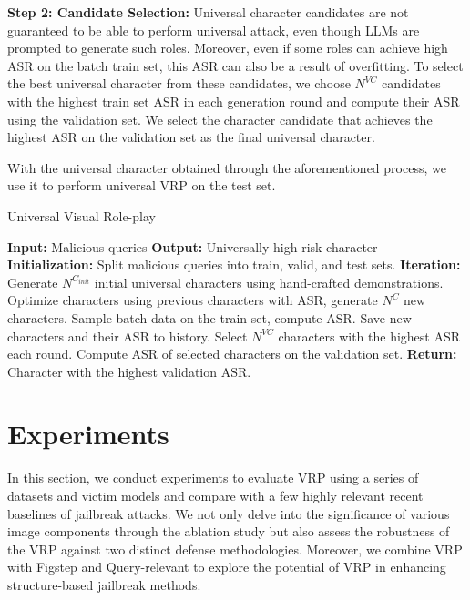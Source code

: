 \textbf{Step 2: Candidate Selection:}
Universal character candidates are not guaranteed to be able to perform universal attack, even though LLMs are prompted to generate such roles. Moreover, even if some roles can achieve high ASR on the batch train set, this ASR can also be a result of overfitting. To select the best universal character from these candidates, we choose $N^{VC}$ candidates with the highest train set ASR in each generation round and compute their ASR using the validation set. We select the character candidate that achieves the highest ASR on the validation set as the final universal character.

With the universal character obtained through the aforementioned process, we use it to perform universal VRP on the test set.

\begin{algorithm}
\caption{Universal Visual Role-play}
\begin{algorithmic}[1]
\State \textbf{Input:} Malicious queries
\State \textbf{Output:} Universally high-risk character
\State \textbf{Initialization:} Split malicious queries into train, valid, and test sets.
\State \textbf{Iteration:}
        \State Generate $N^{C_{init}}$ initial universal characters using hand-crafted demonstrations.
    \EndIf
        \State Optimize characters using previous characters with ASR, generate $N^{C}$ new characters.
    \EndIf
    \State Sample batch data on the train set, compute ASR.
    \State Save new characters and their ASR to history.
    \State Select $N^{VC}$ characters with the highest ASR each round.
    \State Compute ASR of selected characters on the validation set.
\EndFor
\State \textbf{Return:} Character with the highest validation ASR.
\end{algorithmic}
\end{algorithm}
\section{Experiments}\label{sec:exp}

In this section, we conduct experiments to evaluate VRP using a series of datasets and victim models and compare with a few highly relevant recent baselines of jailbreak attacks. We not only delve into the significance of various image components through the ablation study but also assess the robustness of the VRP against two distinct defense methodologies. Moreover, we combine VRP with Figstep and Query-relevant to explore the potential of VRP in enhancing structure-based jailbreak methods.

